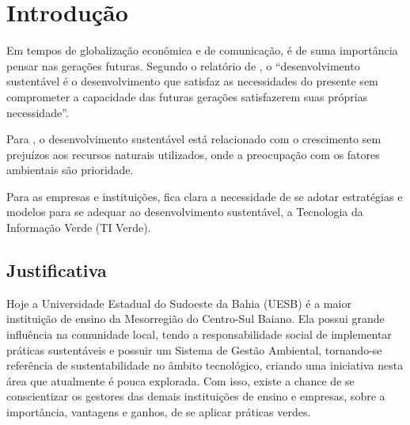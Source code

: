 %
%

\chapter{Introdução}\label{chap:introducao}

Em tempos de globalização econômica e de comunicação, é de suma importância pensar nas gerações futuras. Segundo o relatório de , o ``desenvolvimento sustentável é o desenvolvimento que satisfaz as necessidades do presente sem comprometer a capacidade das futuras gerações satisfazerem suas próprias necessidade''. 

Para , o desenvolvimento sustentável está relacionado com o crescimento sem prejuízos aos recursos naturais utilizados, onde a preocupação com os fatores ambientais são prioridade. 

Para as empresas e instituições, fica clara a necessidade de se adotar estratégias e modelos para se adequar ao desenvolvimento sustentável, a Tecnologia da Informação Verde (TI Verde).


\section{Justificativa}

Hoje a Universidade Estadual do Sudoeste da Bahia (UESB) é a maior instituição de ensino da Mesorregião do Centro-Sul Baiano. Ela possui grande influência na comunidade local, tendo a responsabilidade social de implementar práticas sustentáveis e possuir um Sistema de Gestão Ambiental, tornando-se referência de sustentabilidade no âmbito tecnológico, criando uma iniciativa nesta área que atualmente é pouca explorada. Com isso, existe a chance de se conscientizar os gestores das demais instituições de ensino e empresas, sobre a importância, vantagens e ganhos, de se aplicar práticas verdes. 

